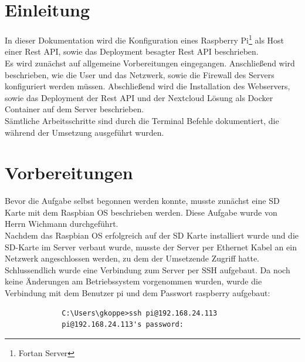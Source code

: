 \documentclass[a4paper, 11pt]{scrartcl}
\begin{document}
\newpage
\thispagestyle{empty}
\tableofcontents
\newpage
\clearpage
{}


\section{Einleitung}
In dieser Dokumentation wird die Konfiguration eines Raspberry Pi\footnote{Fortan \glqq Server\grqq} als Host einer Rest API, sowie das Deployment besagter Rest API beschrieben.
\\
Es wird zunächst auf allgemeine Vorbereitungen eingegangen. Anschließend wird beschrieben, wie die User und das Netzwerk, sowie die Firewall des Servers konfiguriert werden müssen.
Abschließend wird die Installation des Webservers, sowie das Deployment der Rest API und der Nextcloud Lösung als Docker Container auf dem Server beschrieben.
\\
Sämtliche Arbeitsschritte sind durch die Terminal Befehle dokumentiert, die während der Umsetzung ausgeführt wurden.



\section{Vorbereitungen}
Bevor die Aufgabe selbst begonnen werden konnte, musste zunächst eine SD Karte mit dem Raspbian OS beschrieben werden. Diese Aufgabe wurde von Herrn Wichmann durchgeführt.
\\
Nachdem das Raspbian OS erfolgreich auf der SD Karte installiert wurde und die SD-Karte im Server verbaut wurde, musste der Server per Ethernet Kabel an ein Netzwerk
angeschlossen werden, zu dem der Umsetzende Zugriff hatte.
\\
Schlussendlich wurde eine Verbindung zum Server per SSH aufgebaut. Da noch keine Änderungen am Betriebssystem vorgenommen wurden, wurde die Verbindung mit dem Benutzer
\glqq pi\grqq{} und dem Passwort \grqq raspberry\grqq{} aufgebaut:
\begin{figure}[H]
    \begin{mdframed}[backgroundcolor=bbg]
        \begin{lstlisting}
        C:\Users\gkoppe>ssh pi@192.168.24.113
        pi@192.168.24.113's password:
        \end{lstlisting}
    \end{mdframed}
    \label{lst:user_72}
\end{figure}
\end{document}
